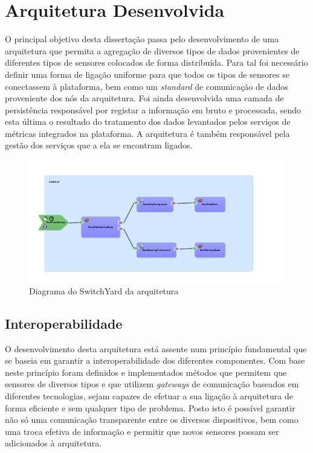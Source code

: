 \chapter{Arquitetura Desenvolvida}

O principal objetivo desta dissertação passa pelo desenvolvimento de uma arquitetura que permita a agregação de diversos tipos de dados provenientes de diferentes tipos de sensores colocados de forma distribuída. Para tal foi necessário definir uma forma de ligação uniforme para que todos os tipos de sensores se conectassem à plataforma, bem como um \textit{standard} de comunicação de dados proveniente dos nós da arquitetura. Foi ainda desenvolvida uma camada de persistência responsável por registar a informação em bruto e processada, sendo esta última o resultado do tratamento dos dados levantados pelos serviços de métricas integrados na plataforma. A arquitetura é também responsável pela gestão dos serviços que a ela se encontram ligados.

\begin{figure}[htb]
   \centering
   \includegraphics[scale=0.55]{Images/switchyard.png}
   \caption{Diagrama do SwitchYard da arquitetura}
\end{figure}

\section{Interoperabilidade}

O desenvolvimento desta arquitetura está assente num princípio fundamental que se baseia em garantir a interoperabilidade dos diferentes componentes. Com base neste princípio foram definidos e implementados métodos que permitem que sensores de diversos tipos e que utilizem \textit{gateways} de comunicação baseados em diferentes tecnologias, sejam capazes de efetuar a sua ligação à arquitetura de forma eficiente e sem qualquer tipo de problema. Posto isto é possível garantir não só uma comunicação transparente entre os diversos dispositivos, bem como uma troca efetiva de informação e permitir que novos sensores possam ser adicionados à arquitetura\cite{vega2012smart}.

